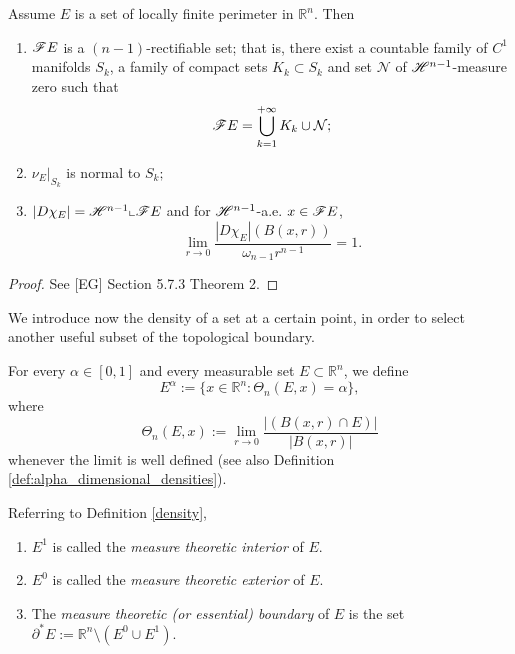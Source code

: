 \begin{theorem} \label{structhm1} Assume $E$ is a set of locally finite perimeter in $\mathbb{R}^{n}$. Then
\begin{enumerate}
	\item $\mathscr{F} E$ is a $(n-1)$-rectifiable set; that is, there exist a countable family of $C^{1}$ manifolds $S_{k}$, a family of compact sets $K_{k} \subset S_{k}$ and set $\mathcal{N}$ of $\mathscr{H}^{n-1}$-measure zero such that
\[ \mathscr{F} E = \bigcup_{k=1}^{+\infty} K_{k} \cup \mathcal{N}; \]
	\item $\nu_{E} |_{S_{k}}$ is normal to $S_{k};$
	\item $|D\chi_{E}| = \mathscr{H}^{n-1} \llcorner \mathscr{F} E$ and for $\mathscr{H}^{n - 1}$-a.e. $x \in \mathscr{F} E$,
\[ \lim_{r \to 0 } \frac{|D\chi_{E}|(B(x,r))}{\omega_{n-1}r^{n - 1}} = 1. \]
\end{enumerate}
\end{theorem}
\begin{proof} See [EG] Section 5.7.3 Theorem 2.
\end{proof}

We introduce now the density of a set at a certain point, in order to select another useful subset of the topological boundary.

\begin{definition} \label{density} For every $\alpha \in [0, 1]$ and every measurable set $E \subset \mathbb{R}^{n}$, we define
\[ E^{\alpha} := \{ x \in \mathbb{R}^{n} : \Theta_{n}(E, x) = \alpha \}, \]
where
\[ \Theta_{n}(E, x) := \lim_{r \to 0} \frac{|(B(x,r) \cap E)|}{|B(x,r)|}  \]
whenever the limit is well defined (see also Definition \ref{def:alpha_dimensional_densities}).
\end{definition}

\begin{definition} \label{measuretheorintext} Referring to Definition \ref{density},
\begin{enumerate}
	\item $E^{1}$ is called the {\em measure theoretic interior} of $E$.
	\item $E^{0}$ is called the {\em measure theoretic exterior} of $E$.
	\item The {\em measure theoretic (or essential) boundary} of $E$ is the set $\partial^{*} E := \mathbb{R}^{n} \setminus (E^{0} \cup E^{1})$.
\end{enumerate}
\end{definition}

